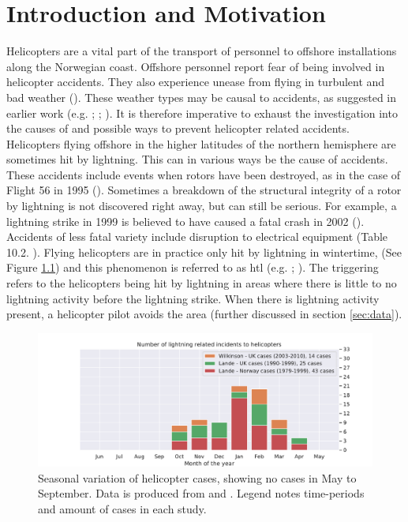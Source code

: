 \chapter{Introduction and Motivation}\label{ch:introduction}

Helicopters are a vital part of the transport of personnel to offshore installations along the Norwegian coast. Offshore personnel report fear of being involved in helicopter accidents. They also experience unease from flying in turbulent and bad weather (\cite{wasilewska2019}). These weather types may be causal to accidents, as suggested in earlier work (e.g. \cite{lande1999}; \cite{wilkinson2013}; \cite{smart1997}). It is therefore imperative to exhaust the investigation into the causes of and possible ways to prevent helicopter related accidents. 
Helicopters flying offshore in the higher latitudes of the northern hemisphere are sometimes hit by lightning. This can in various ways be the cause of accidents. These accidents include events when rotors have been destroyed, as in the case of Flight 56 in 1995 (\cite{smart1997}). Sometimes a breakdown of the structural integrity of a rotor by lightning is not discovered right away, but can still be serious. For example, a lightning strike in 1999 is believed to have caused a fatal crash in 2002 (\cite{smart2005}). Accidents of less fatal variety include disruption to electrical equipment (Table 10.2. \cite{rakovBok}). Flying helicopters are in practice only hit by lightning in wintertime, (See Figure \ref{fig:landewilk}) and this phenomenon is referred to as \acrfull{htl} (e.g. \cite{lande1999}; \cite{wilkinson2013}). The triggering refers to the helicopters being hit by lightning in areas where there is little to no lightning activity before the lightning strike. When there is lightning activity present, a helicopter pilot avoids the area (further discussed in section \ref{sec:data}).


\begin{figure}
    \centering
    \includegraphics[width=\textwidth]{Figures/yearlydistribution_withoutmine.pdf}
    \caption{Seasonal variation of helicopter cases, showing no cases in May to September. Data is produced from \cite{lande1999} and \cite{wilkinson2013}. Legend notes time-periods and amount of cases in each study.}
    \label{fig:landewilk}
\end{figure}

